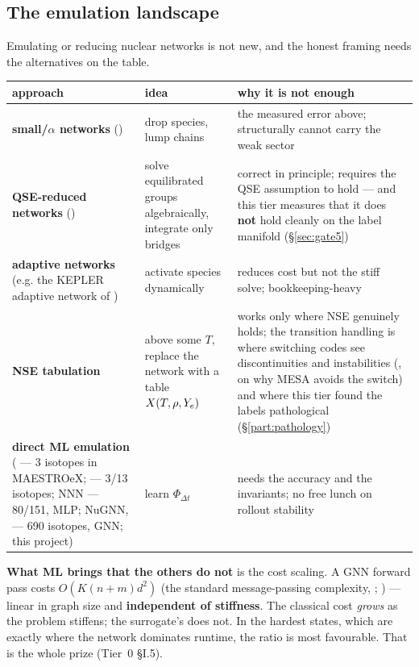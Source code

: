 \subsection{The emulation landscape}
\label{sec:landscape}

Emulating or reducing nuclear networks is not new, and the honest framing needs
the alternatives on the table.

\begingroup\small
\begin{tabularx}{\textwidth}{@{}L{3.9cm} L{3.4cm} Y@{}}
\toprule
\textbf{approach} & \textbf{idea} & \textbf{why it is not enough} \\
\midrule
\textbf{small/$\alpha$ networks} () &
  drop species, lump chains &
  the measured \Ye{} error above; structurally cannot carry the weak sector \\
\textbf{QSE-reduced networks} (\citealt{hix1996, hix1999b, hix2007}) &
  solve equilibrated groups algebraically, integrate only bridges &
  correct in principle; requires the QSE assumption to hold --- and this tier
  measures that it does \textbf{not} hold cleanly on the label manifold
  (\S\ref{sec:gate5}) \\
\textbf{adaptive networks} (e.g. the KEPLER adaptive network of
  \citealt{rauscher2002} ) &
  activate species dynamically &
  reduces cost but not the stiff solve; bookkeeping-heavy \\
\textbf{NSE tabulation} &
  above some $T$, replace the network with a table $X(T, \rho, Y_{e})$ &
  works only where NSE genuinely holds; the transition handling is where
  switching codes see discontinuities and instabilities (\citealt[\S
  5.2]{paxton2015}, on why MESA avoids the switch) and where this tier found the
  labels pathological (\S\ref{part:pathology}) \\
\textbf{direct ML emulation} (\citealt{fan2022} --- 3 isotopes in MAESTROeX;
  \citealt{zhang2025} --- 3/13 isotopes; NNN --- 80/151, MLP; NuGNN,
  \citealt{kim2026} --- 690 isotopes, GNN; this project) &
  learn $\Phi_{\Delta t}$ &
  needs the accuracy and the invariants; no free lunch on rollout stability \\
\bottomrule
\end{tabularx}
\endgroup

\textbf{What ML brings that the others do not} is the cost scaling. A GNN
forward pass costs $O(K(n + m)d^2)$ (the standard message-passing complexity,
\citealt{gilmer2017}; \citealt{battaglia2018}) --- linear in graph size and
\textbf{independent of stiffness}. The classical cost \emph{grows} as the
problem stiffens; the surrogate's does not. In the hardest states, which are
exactly where the network dominates runtime, the ratio is most favourable. That
is the whole prize (Tier~0 \S I.5).

